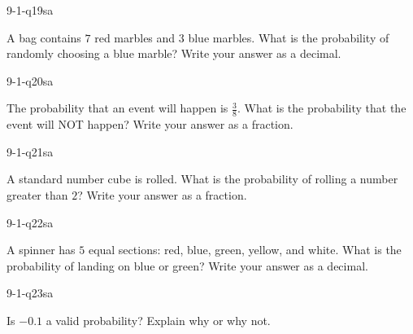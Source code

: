 
\begin{practiceQuestion}{9-1-q19}{sa}
\begin{questionText}
A bag contains $7$ red marbles and $3$ blue marbles. What is the probability of randomly choosing a blue marble? Write your answer as a decimal.
\end{questionText}
\end{practiceQuestion}

\begin{practiceQuestion}{9-1-q20}{sa}
\begin{questionText}
The probability that an event will happen is $\frac{3}{8}$. What is the probability that the event will NOT happen? Write your answer as a fraction.
\end{questionText}
\end{practiceQuestion}

\begin{practiceQuestion}{9-1-q21}{sa}
\begin{questionText}
A standard number cube is rolled. What is the probability of rolling a number greater than $2$? Write your answer as a fraction.
\end{questionText}
\end{practiceQuestion}

\begin{practiceQuestion}{9-1-q22}{sa}
\begin{questionText}
A spinner has $5$ equal sections: red, blue, green, yellow, and white. What is the probability of landing on blue or green? Write your answer as a decimal.
\end{questionText}
\end{practiceQuestion}

\begin{practiceQuestion}{9-1-q23}{sa}
\begin{questionText}
Is $-0.1$ a valid probability? Explain why or why not.
\end{questionText}
\end{practiceQuestion}

